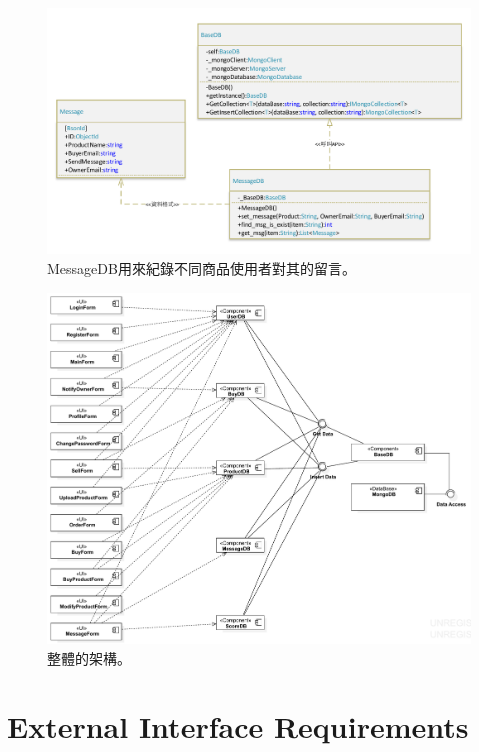 \documentclass{scrreprt}
\begin{document}
\begin{CJK}{UTF8}{bkai}
\begin{figure}
	\includegraphics[width=\textwidth]{MessageDB.pdf}
	\caption{MessageDB用來紀錄不同商品使用者對其的留言。}
\end{figure}

\begin{figure}
	\includegraphics[width=\textwidth]{ComponentDiagram1.pdf}
	\caption{整體的架構。}
\end{figure}


\chapter{External Interface Requirements}


\end{CJK}
\end{document}
